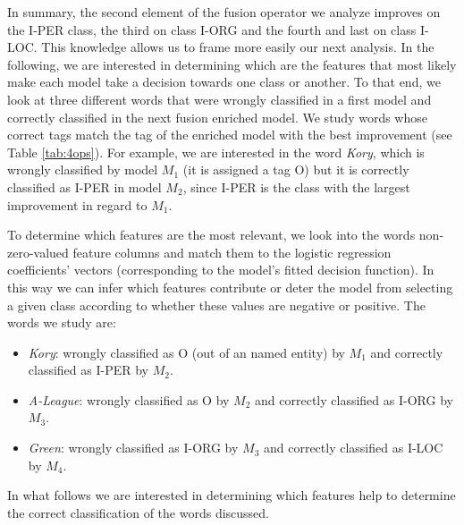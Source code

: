 In summary, the second element of the fusion operator we analyze improves on the I-PER class, the third on class I-ORG and the fourth and last on class I-LOC. This knowledge allows us to frame more easily our next analysis. In the following, we are interested in determining which are the features that most likely make each model take  a decision towards one class or another. To that end, we look at three different words that were wrongly classified in a first model and correctly classified in the next fusion enriched model. We study words whose correct tags match the tag of the enriched model with the best improvement (see Table \ref{tab:4ops}). For example, we are interested in the word \textit{Kory}, which is wrongly classified by model $M_1$ (it is assigned a tag O) but it is correctly classified as I-PER in model $M_2$, since I-PER is the class with the largest improvement in regard to $M_1$.

To determine which features are the most relevant, we look into the words non-zero-valued feature columns and match them to the logistic regression  coefficients' vectors (corresponding to the model's fitted decision function). In this way we can infer which features contribute or deter  the model from selecting a given class according to whether these values are negative or positive. The words we study are:
\begin{itemize}
\item \textit{Kory}: wrongly classified as O (out of an named entity) by $M_1$ and correctly classified as I-PER by $M_2$.
\item \textit{A-League}: wrongly classified as O by $M_2$ and correctly classified as I-ORG by $M_3$.
\item \textit{Green}: wrongly classified as  I-ORG by $M_3$ and correctly classified as I-LOC by $M_4$.
\end{itemize}

In what follows we are interested in determining which features help to determine the correct classification of the words discussed.
                                                                                                                         
